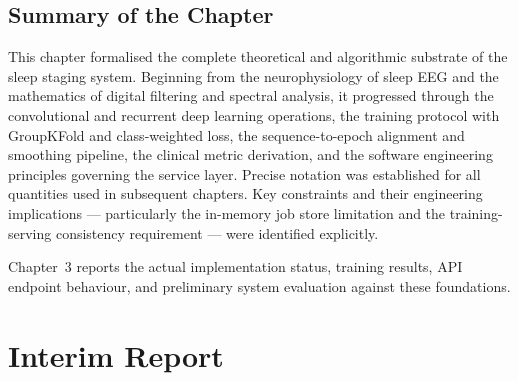 \documentclass[10pt]{article}
\begin{document}
\subsection{Summary of the Chapter}
\label{sec:summaryFoundation}

This chapter formalised the complete theoretical and algorithmic substrate of the sleep staging system. Beginning from the neurophysiology of sleep EEG and the mathematics of digital filtering and spectral analysis, it progressed through the convolutional and recurrent deep learning operations, the training protocol with GroupKFold and class-weighted loss, the sequence-to-epoch alignment and smoothing pipeline, the clinical metric derivation, and the software engineering principles governing the service layer. Precise notation was established for all quantities used in subsequent chapters. Key constraints and their engineering implications --- particularly the in-memory job store limitation and the training-serving consistency requirement --- were identified explicitly.

Chapter~3 reports the actual implementation status, training results, API endpoint behaviour, and preliminary system evaluation against these foundations.

\newpage
\section{Interim Report}
\label{sec:interimReport}
\end{document}

